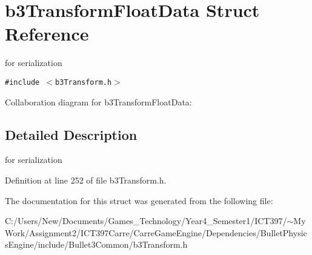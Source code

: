 \hypertarget{structb3_transform_float_data}{
\section{b3TransformFloatData Struct Reference}
\label{structb3_transform_float_data}
}
for serialization  


{\tt \#include $<$b3Transform.h$>$}

Collaboration diagram for b3TransformFloatData:

\subsection{Detailed Description}
for serialization 

Definition at line 252 of file b3Transform.h.

The documentation for this struct was generated from the following file:\begin{CompactItemize}
\item 
C:/Users/New/Documents/Games\_\-Technology/Year4\_\-Semester1/ICT397/$\sim$My Work/Assignment2/ICT397Carre/CarreGameEngine/Dependencies/BulletPhysicsEngine/include/Bullet3Common/b3Transform.h\end{CompactItemize}
